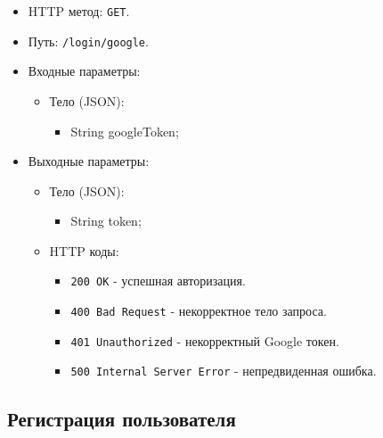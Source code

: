 \documentclass[a4paper, 14pt]{article}
\begin{document}
\begin{itemize}
    \item HTTP метод: \texttt{GET}.
    \item Путь: \texttt{/login/google}.
    \item Входные параметры:
    \begin{itemize}
        \item Тело (JSON):
        \begin{itemize}
            \item String googleToken;
        \end{itemize}
    \end{itemize}
    \item Выходные параметры:
    \begin{itemize}
        \item Тело (JSON):
        \begin{itemize}
            \item String token;
        \end{itemize}
        \item HTTP коды:
        \begin{itemize}
            \item \texttt{200 OK} - успешная авторизация.
            \item \texttt{400 Bad Request} - некорректное тело запроса.
            \item \texttt{401 Unauthorized} - некорректный Google токен.
            \item \texttt{500 Internal Server Error} - непредвиденная ошибка.
        \end{itemize}
    \end{itemize}
\end{itemize}

\subsection{Регистрация пользователя}
\end{document}
